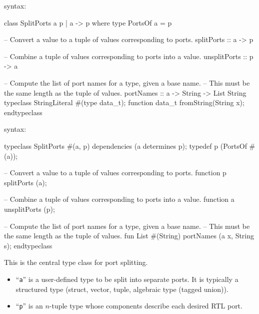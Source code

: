 {\BHb} syntax:
\begin{libverbatim}
   class SplitPorts a p | a -> p where
     type PortsOf a = p

     -- Convert a value to a tuple of values corresponding to ports.
     splitPorts :: a -> p

     -- Combine a tuple of values corresponding to ports into a value.
     unsplitPorts :: p -> a

     -- Compute the list of port names for a type, given a base name.
     -- This must be the same length as the tuple of values.
     portNames :: a -> String -> List String
      typeclass StringLiteral #(type data_t);
          function data_t fromString(String x);
      endtypeclass
\end{libverbatim}

{\BSVb} syntax:
\begin{libverbatim}
   typeclass SplitPorts #(a, p)
     dependencies (a determines p);
     typedef p (PortsOf #(a));

     -- Convert a value to a tuple of values corresponding to ports.
     function p splitPorts (a);

     -- Combine a tuple of values corresponding to ports into a value.
     function a unsplitPorts (p);

     -- Compute the list of port names for a type, given a base name.
     -- This must be the same length as the tuple of values.
     fun List #(String) portNames (a x, String s);
   endtypeclass
\end{libverbatim}

This is the central type class for port splitting.
\begin{itemize}

  \item ``{\tt a}'' is a user-defined type to be split into separate
        ports. It is typically a structured type (struct, vector,
        tuple, algebraic type (tagged union)).

  \item ``{\tt p}'' is an $n$-tuple type whose components describe each desired RTL port.
\end{itemize}

